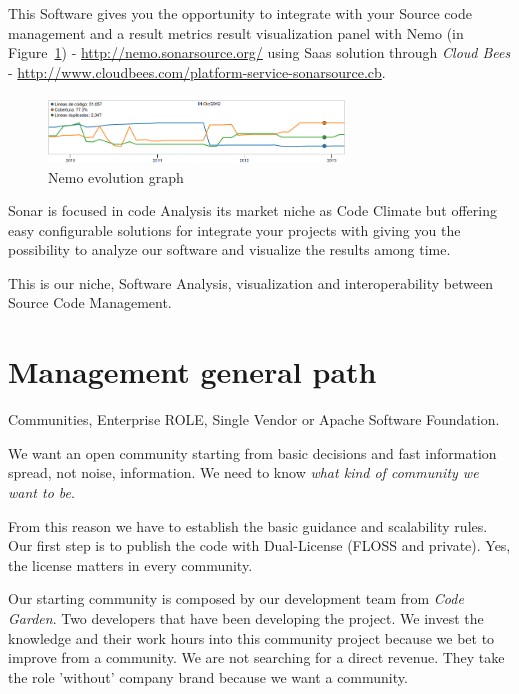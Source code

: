 \documentclass[11pt]{scrartcl}
\begin{document}
\par This Software gives you the opportunity to integrate with your Source code management and a result metrics result visualization panel with Nemo (in Figure~\ref{nemo-evolution}) - \url{http://nemo.sonarsource.org/} using Saas solution through \emph{Cloud Bees} - \url{http://www.cloudbees.com/platform-service-sonarsource.cb}.

\begin{figure}[H]
\centering
\includegraphics[width=0.7\textwidth]{nemo-evolution.png}
\caption{Nemo evolution graph}
\label{nemo-evolution}
\end{figure}

\par Sonar is focused in code Analysis its market niche as Code Climate but offering easy configurable solutions for integrate your projects with giving you the possibility to analyze our software and visualize the results among time.

\par This is our niche, Software Analysis, visualization and interoperability between Source Code Management.


\section{Management general path}
\label{sec:management-path}

\par Communities, Enterprise ROLE, Single Vendor or Apache Software Foundation.

\par We want an open community starting from basic decisions and fast information spread, not noise, information. We need to know \emph{what kind of community we want to be}.

\par From this reason we have to establish the basic guidance and scalability rules. Our first step is to publish the code with Dual-License (FLOSS and private). Yes, the license matters in every community.

\par Our starting community is composed by our development team from \emph{Code Garden}. Two developers that have been developing the project. We invest the knowledge and their work hours into this community project because we bet to improve from a community. We are not searching for a direct revenue. They take the role 'without' company brand because we want a community. 
\end{document}
